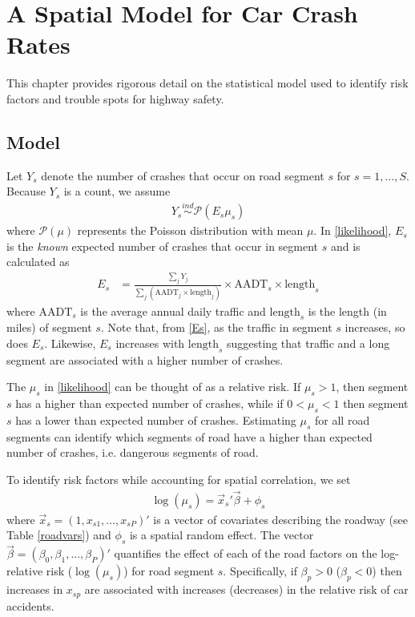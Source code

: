 \chapter{A Spatial Model for Car Crash Rates}
This chapter provides rigorous detail on the statistical model used to identify risk factors and trouble spots for highway safety.
\section{Model}
Let $Y_s$ denote the number of crashes that occur on road segment $s$ for $s=1,\dots, S$.  Because $Y_s$ is a count, we assume 
\begin{align}
Y_s \overset{ind}{\sim} \mathcal{P}\left( E_s \mu_s\right)
\label{likelihood}
\end{align}
where $\mathcal{P}(\mu)$ represents the Poisson distribution with mean $\mu$. In \eqref{likelihood}, $E_s$ is the \textit{known} expected number of crashes that occur in segment $s$ and is calculated as \
\begin{align}
E_s &= \frac{\sum_j Y_j}{\sum_j (\textrm{AADT}_j \times \textrm{length}_j)} \times \textrm{AADT}_s \times \textrm{length}_s
\label{Es}
\end{align}
where $\textrm{AADT}_s$ is the average annual daily traffic and $\textrm{length}_s$ is the length (in miles) of segment $s$.  Note that, from \eqref{Es}, as the traffic in segment $s$ increases, so does $E_s$.  Likewise, $E_s$ increases with $\textrm{length}_s$ suggesting that traffic and a long segment are associated with a higher number of crashes.

The $\mu_s$ in \eqref{likelihood} can be thought of as a relative risk. If $\mu_s > 1$, then segment $s$ has a higher than expected number of crashes, while if $0 < \mu_s < 1 $ then segment $s$ has a lower than expected number of crashes. Estimating $\mu_s$ for all road segments can identify which segments of road have a higher than expected number of crashes, i.e. dangerous segments of road.

To identify risk factors while accounting for spatial correlation,  we set
\begin{align}
\log(\mu_s) =  \vec{x}_s' \vec{\beta} + \phi_s
\label{rr}
\end{align}
where $\vec{x}_s = (1,x_{s1},\dots,x_{sP})'$ is a vector of covariates describing the roadway (see Table \ref{roadvars}) and $\phi_s$ is a spatial random effect. The vector $\vec{\beta} = (\beta_0,\beta_1,\dots,\beta_P)'$ quantifies the effect of each of the road factors on the log-relative risk ($\log(\mu_s)$) for road segment $s$. Specifically, if $\beta_p > 0$ ($\beta_p<0$) then increases in $x_{sp}$ are associated with increases (decreases) in the relative risk of car accidents.

